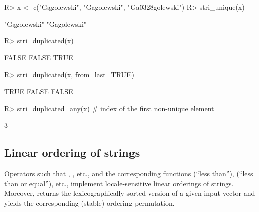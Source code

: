 \documentclass[nojss]{jss}
\begin{document}
\begin{Schunk}
\begin{Sinput}
R> x <- c("Gągolewski", "Gagolewski", "Ga\u0328golewski")
R> stri_unique(x)
\end{Sinput}
\begin{Soutput}
[1] "Gągolewski" "Gagolewski"
\end{Soutput}
\begin{Sinput}
R> stri_duplicated(x)
\end{Sinput}
\begin{Soutput}
[1] FALSE FALSE  TRUE
\end{Soutput}
\begin{Sinput}
R> stri_duplicated(x, from_last=TRUE)
\end{Sinput}
\begin{Soutput}
[1]  TRUE FALSE FALSE
\end{Soutput}
\begin{Sinput}
R> stri_duplicated_any(x)  # index of the first non-unique element
\end{Sinput}
\begin{Soutput}
[1] 3
\end{Soutput}
\end{Schunk}







\subsection{Linear ordering of strings}



Operators such that , \code{\%<=\%}, etc.,
and the corresponding functions
 (``less than''),
 (``less than or equal''), etc.,
implement locale-sensitive linear orderings of strings.
Moreover,  returns the lexicographically-sorted
version of a given input vector and  yields
the corresponding
(stable) ordering permutation.


\end{document}

